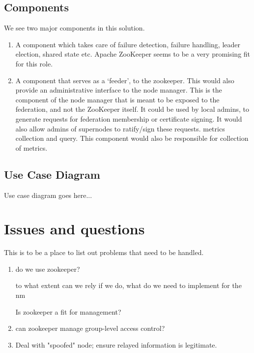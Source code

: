 \documentclass[oneside,12pt]{memoir}
\begin{document}
\subsection{Components}
We see two major components in this solution.
\begin{enumerate}
\item 
A component which takes care of failure detection, failure handling, leader election, shared state etc.
Apache ZooKeeper seems to be a very promising fit for this role.
\item
A component that serves as a `feeder', to the zookeeper. This would also provide an administrative interface to the node manager. This is the component of the node manager that is meant to be exposed to the federation, and not the ZooKeeper itself. It could be used by local admins, to generate requests for federation membership or certificate signing. It would also allow admins of supernodes to ratify/sign these requests.
metrics collection and query. This component would also be responsible for collection of metrics.
\end{enumerate}

\subsection{Use Case Diagram}
Use case diagram goes here...


\section{Issues and questions}
This is to be a place to list out problems that need to be handled.
\begin{enumerate}
\item
do we use zookeeper?

to what extent can we rely if we do,  what do we need to implement for the nm


Is zookeeper a fit for management?
\item
can zookeeper manage group-level access control?
\item
Deal with "spoofed" node; ensure relayed information is legitimate. 


\end{enumerate}
\hypertarget{mymarker}{}
\printindex
\end{document}
